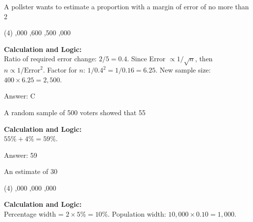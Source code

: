 \documentclass[11pt,paper=a4,answers]{exam}
\begin{document}
\begin{questions}
\question
A pollster wants to estimate a proportion with a margin of error of no more than 2%
\begin{tasks}(4)
    ,000
    ,600
    ,500
    ,000
\end{tasks}

\begin{solution}
\textbf{Calculation and Logic:} \\
Ratio of required error change: $2/5 = 0.4$. Since Error $\propto 1/\sqrt{n}$, then $n \propto 1/\text{Error}^2$. Factor for $n$: $1 / 0.4^2 = 1 / 0.16 = 6.25$. New sample size: $400 \times 6.25 = 2,500$.

\vspace{30pt}

Answer: \colorbox{yellow!100}{C}
\end{solution}

\vspace{60pt}

\question
A random sample of 500 voters showed that 55%

\begin{solution}
\textbf{Calculation and Logic:} \\
$55\% + 4\% = 59\%$.

\vspace{30pt}

Answer: \colorbox{yellow!100}{59}
\end{solution}

\vspace{60pt}

\question
An estimate of 30%
\begin{tasks}(4)
    ,000
    ,000
    ,000
\end{tasks}

\begin{solution}
\textbf{Calculation and Logic:} \\
Percentage width = $2 \times 5\% = 10\%$. Population width: $10,000 \times 0.10 = 1,000$.


\end{solution}
\end{questions}
\end{document}
